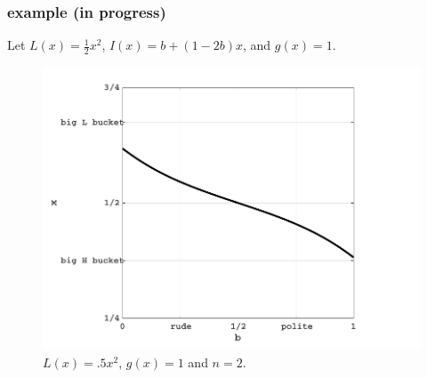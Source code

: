 \documentclass[12pt]{article}
\begin{document}
\subsubsection{example (in progress)}
Let $L(x)=\frac{1}{2}x^2$, $I(x)=b+(1-2b)x$, and $g(x)=1$.
\begin{figure}[H]
\centering
\includegraphics{example1}
\caption{$L(x)=.5x^2$, $g(x)=1$ and $n=2$.}
\end{figure}
\end{document}
